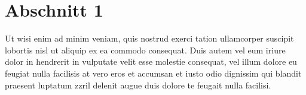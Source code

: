 \section{Abschnitt 1}
\label{sec:abschnitt1}

Ut wisi enim ad minim veniam, quis nostrud exerci tation ullamcorper suscipit lobortis nisl ut aliquip ex ea commodo consequat.
Duis autem vel eum iriure dolor in hendrerit in vulputate velit esse molestie consequat, vel illum dolore eu feugiat nulla facilisis at vero eros et accumsan et iusto odio dignissim qui blandit praesent luptatum zzril delenit augue duis dolore te feugait nulla facilisi. 